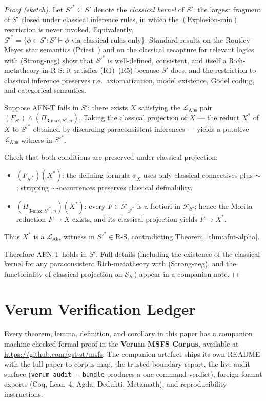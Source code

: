 \documentclass[11pt]{article}
\theoremstyle{plain}
\theoremstyle{definition}
\newcommand{\RS}{\mathrm{R\text{-}S}}
\newcommand{\cS}{\mathcal{S}}
\newcommand{\cF}{\mathcal{F}}
\newcommand{\LAbs}{\mathcal{L}_{\mathrm{Abs}}}
\begin{document}
\begin{proof}[Proof (sketch)]

Let $S'^* \subseteq S'$ denote the \emph{classical kernel} of $S'$: the largest fragment of $S'$ closed under classical inference rules, in which the $(\text{Explosion-min})$ restriction is never invoked. Equivalently, $S'^* = \{\phi \in S' : S' \vdash \phi \text{ via classical rules only}\}$. Standard results on the Routley--Meyer star semantics (Priest~\cite{Priest2006}) and on the classical recapture for relevant logics with (Strong-neg) show that $S'^*$ is well-defined, consistent, and itself a Rich-metatheory in $\RS$: it satisfies (R1)--(R5) because $S'$ does, and the restriction to classical inference preserves r.e.\ axiomatization, model existence, G\"odel coding, and categorical semantics.

Suppose AFN-T fails in $S'$: there exists $X$ satisfying the $\LAbs$ pair $(F_{S'}) \wedge (\Pi_{3\text{-max}, S', n})$. Taking the classical projection of $X$ --- the reduct $X^*$ of $X$ to $S'^*$ obtained by discarding paraconsistent inferences --- yields a putative $\LAbs$ witness in $S'^*$.

Check that both conditions are preserved under classical projection:
\begin{itemize}
\item $(F_{S'^*})(X^*)$: the defining formula $\phi_X$ uses only classical connectives plus $\sim$; stripping $\sim$-occurrences preserves classical definability.
\item $(\Pi_{3\text{-max}, S'^*, n})(X^*)$: every $F \in \cF_{S'^*}$ is a fortiori in $\cF_{S'}$; hence the Morita reduction $F \to X$ exists, and its classical projection yields $F \to X^*$.
\end{itemize}

Thus $X^*$ is a $\LAbs$ witness in $S'^* \in \RS$, contradicting Theorem~\ref{thm:afnt-alpha}.

Therefore AFN-T holds in $S'$. Full details (including the existence of the classical kernel for any paraconsistent Rich-metatheory with (Strong-neg), and the functoriality of classical projection on $\cS_{S'}$) appear in a companion note.
\end{proof}

\section{Verum Verification Ledger}\label{app:verification-ledger}

Every theorem, lemma, definition, and corollary in this paper has a
companion machine-checked formal proof in the \textbf{Verum MSFS
Corpus}, available at \url{https://github.com/gst-st/msfs}.  The
companion artefact ships its own README with the full paper-to-corpus
map, the trusted-boundary report, the live audit surface
(\texttt{verum audit -\!-bundle} produces a one-command verdict),
foreign-format exports (Coq, Lean~4, Agda, Dedukti, Metamath), and
reproducibility instructions.
\end{document}
